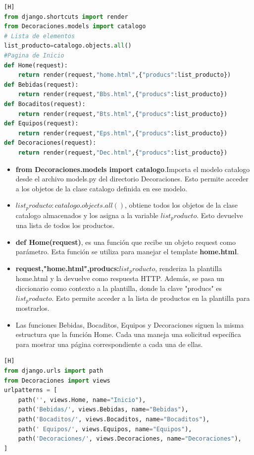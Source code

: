 \documentclass{article}
\begin{document}
    \begin{lstlisting}[language=python,caption={Decoraciones/views.py}][H]
from django.shortcuts import render
from Decoraciones.models import catalogo
# Lista de elementos
list_producto=catalogo.objects.all()
#Pagina de Inicio
def Home(request):
    return render(request,"home.html",{"producs":list_producto})
def Bebidas(request):
    return render(request,"Bbs.html",{"producs":list_producto})
def Bocaditos(request):
    return render(request,"Bts.html",{"producs":list_producto})
def Equipos(request):
    return render(request,"Eps.html",{"producs":list_producto})
def Decoraciones(request):
    return render(request,"Dec.html",{"producs":list_producto})
    \end{lstlisting}
	\begin{itemize}
	    \item \textbf{from Decoraciones.models import catalogo}.Importa el modelo catalogo desde el archivo models.py del directorio Decoraciones. Esto permite acceder a los objetos de la clase catalogo definida en ese modelo.
        \item \textbf{$list_producto : catalogo.objects.all()$}, obtiene todos los objetos de la clase catalogo almacenados y los asigna a la variable \textbf{$list_producto$}. Esto devuelve una lista de todos los productos.
        \item \textbf{def Home(request)}, es una función que recibe un objeto request como parámetro. Esta función se utiliza para manejar el template \textbf{home.html}.
        \item \textbf{request,"home.html",producs:$list_producto$}, renderiza la plantilla home.html y la devuelve como respuesta HTTP. Además, se pasa un diccionario como contexto a la plantilla, donde la clave "producs" es $list_producto$. Esto permite acceder a la lista de productos en la plantilla para mostrarlos.
        \item Las funciones Bebidas, Bocaditos, Equipos y Decoraciones siguen la misma estructura que la función Home. Cada una maneja una solicitud específica para mostrar una página correspondiente a cada una de ellas.
    \end{itemize}
	\begin{lstlisting}[language=python,caption={Decoraciones/urls.py}][H]
from django.urls import path
from Decoraciones import views
urlpatterns = [
    path('', views.Home, name="Inicio"),
    path('Bebidas/', views.Bebidas, name="Bebidas"),
    path('Bocaditos/', views.Bocaditos, name="Bocaditos"),
    path(' Equipos/', views.Equipos, name="Equipos"),
    path('Decoraciones/', views.Decoraciones, name="Decoraciones"),
]
    \end{lstlisting}
\end{document}
